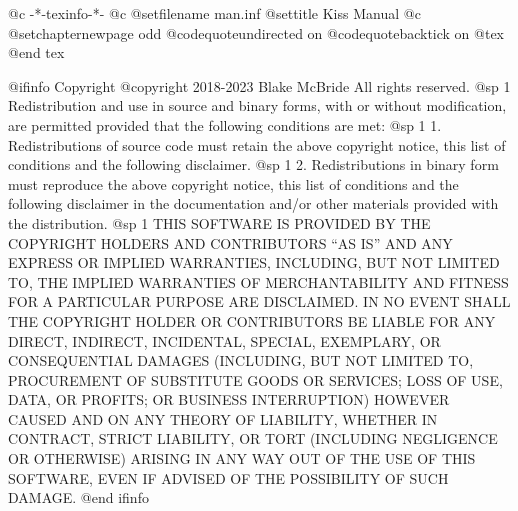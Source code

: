     @c -*-texinfo-*-
@c %
@setfilename man.inf
@settitle Kiss Manual
@c %
@setchapternewpage odd
@codequoteundirected on
@codequotebacktick on
@tex
\global\def\linkcolor{0 0 1}  %
\global\def\urlcolor{0 0 1}   %
@end tex

@ifinfo
Copyright  @copyright{} 2018-2023 Blake McBride
All rights reserved.
@sp 1
Redistribution and use in source and binary forms, with or without
modification, are permitted provided that the following conditions are
met:
@sp 1
1. Redistributions of source code must retain the above copyright
notice, this list of conditions and the following disclaimer.
@sp 1
2. Redistributions in binary form must reproduce the above copyright
notice, this list of conditions and the following disclaimer in the
documentation and/or other materials provided with the distribution.
@sp 1
THIS SOFTWARE IS PROVIDED BY THE COPYRIGHT HOLDERS AND CONTRIBUTORS
``AS IS'' AND ANY EXPRESS OR IMPLIED WARRANTIES, INCLUDING, BUT NOT
LIMITED TO, THE IMPLIED WARRANTIES OF MERCHANTABILITY AND FITNESS FOR
A PARTICULAR PURPOSE ARE DISCLAIMED. IN NO EVENT SHALL THE COPYRIGHT
HOLDER OR CONTRIBUTORS BE LIABLE FOR ANY DIRECT, INDIRECT, INCIDENTAL,
SPECIAL, EXEMPLARY, OR CONSEQUENTIAL DAMAGES (INCLUDING, BUT NOT
LIMITED TO, PROCUREMENT OF SUBSTITUTE GOODS OR SERVICES; LOSS OF USE,
DATA, OR PROFITS; OR BUSINESS INTERRUPTION) HOWEVER CAUSED AND ON ANY
THEORY OF LIABILITY, WHETHER IN CONTRACT, STRICT LIABILITY, OR TORT
(INCLUDING NEGLIGENCE OR OTHERWISE) ARISING IN ANY WAY OUT OF THE USE
OF THIS SOFTWARE, EVEN IF ADVISED OF THE POSSIBILITY OF SUCH DAMAGE.
@end ifinfo

